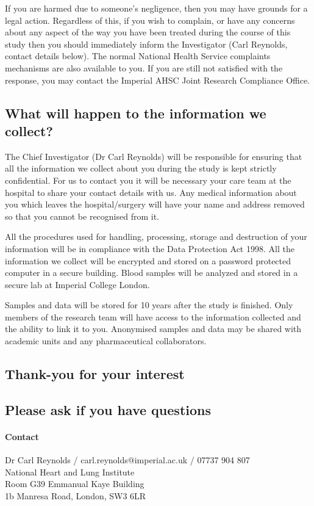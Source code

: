 \documentclass[a4paper,10pt]{article}
\begin{document}
If you are harmed due to someone’s negligence, then you may have grounds for a legal action. Regardless of this, if you wish to complain, or have any concerns about any aspect of the way you have been treated during the course of this study then you should immediately inform the Investigator (Carl Reynolds, contact details below). The normal National Health Service complaints mechanisms are also available to you. If you are still not satisfied with the response, you may contact the
Imperial AHSC Joint Research Compliance Office. 


\subsection*{What will happen to the information we collect?}

The Chief Investigator (Dr Carl Reynolds) will be responsible for ensuring that all the information we collect about you during the study is kept strictly confidential. For us to contact you it will be necessary your care team at the hospital to share your contact details with us. 
Any medical information about you which leaves the hospital/surgery will have your name and address removed so that you cannot be recognised from it. 

All the procedures used for handling, processing, storage and destruction of your information will be in compliance with the Data Protection Act 1998. All the information we collect will be encrypted and stored on a password protected computer in a secure building. Blood samples will be analyzed and stored in a secure lab at Imperial College London. 

Samples and data will be stored for 10 years after the study is finished. Only members of the research team will have access to the information collected and the ability to link it to you. Anonymised samples and data may be shared with academic units and any pharmaceutical collaborators.

\begin{centering}
\subsection*{Thank-you for your interest}
\subsection*{Please ask if you have questions}
\end{centering}

\vspace{1cm}

\paragraph{Contact} 
\begin{flushleft}
Dr Carl Reynolds / carl.reynolds@imperial.ac.uk / 07737 904 807 \\ 
National Heart and Lung Institute\\
Room G39 Emmanual Kaye Building\\
1b Manresa Road, London, SW3 6LR
\end{flushleft}


 
\end{document}
